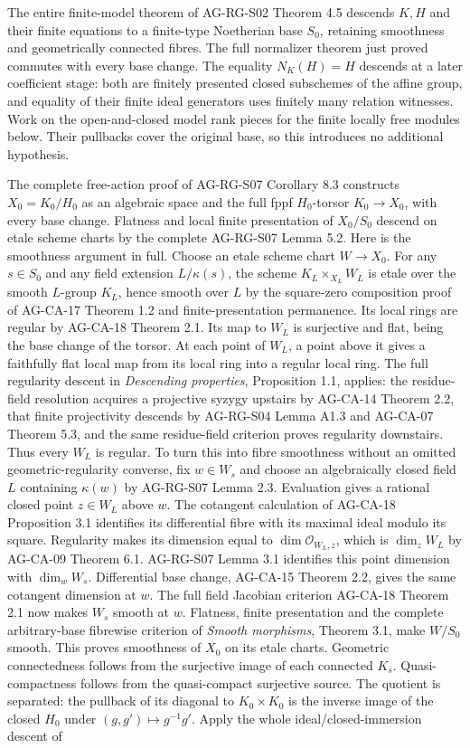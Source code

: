 \documentclass[11pt,a4paper,openany]{report}
\begin{document}
The entire finite-model theorem of AG-RG-S02 Theorem 4.5 descends \(K,H\) and their finite equations to a finite-type Noetherian base \(S_0\), retaining smoothness and geometrically connected fibres. The full normalizer theorem just proved commutes with every base change. The equality \(N_K(H)=H\) descends at a later coefficient stage: both are finitely presented closed subschemes of the affine group, and equality of their finite ideal generators uses finitely many relation witnesses. Work on the open-and-closed model rank pieces for the finite locally free modules below. Their pullbacks cover the original base, so this introduces no additional hypothesis.

The complete free-action proof of AG-RG-S07 Corollary 8.3 constructs \(X_0=K_0/H_0\) as an algebraic space and the full fppf \(H_0\)-torsor \(K_0\to X_0\), with every base change. Flatness and local finite presentation of \(X_0/S_0\) descend on etale scheme charts by the complete AG-RG-S07 Lemma 5.2. Here is the smoothness argument in full. Choose an etale scheme chart \(W\to X_0\). For any \(s\in S_0\) and any field extension \(L/\kappa(s)\), the scheme \(K_L\times_{X_L}W_L\) is etale over the smooth \(L\)-group \(K_L\), hence smooth over \(L\) by the square-zero composition proof of AG-CA-17 Theorem 1.2 and finite-presentation permanence. Its local rings are regular by AG-CA-18 Theorem 2.1. Its map to \(W_L\) is surjective and flat, being the base change of the torsor. At each point of \(W_L\), a point above it gives a faithfully flat local map from its local ring into a regular local ring. The full regularity descent in \emph{Descending properties}, Proposition 1.1, applies: the residue-field resolution acquires a projective syzygy upstairs by AG-CA-14 Theorem 2.2, that finite projectivity descends by AG-RG-S04 Lemma A1.3 and AG-CA-07 Theorem 5.3, and the same residue-field criterion proves regularity downstairs. Thus every \(W_L\) is regular. To turn this into fibre smoothness without an omitted geometric-regularity converse, fix \(w\in W_s\) and choose an algebraically closed field \(L\) containing \(\kappa(w)\) by AG-RG-S07 Lemma 2.3. Evaluation gives a rational closed point \(z\in W_L\) above \(w\). The cotangent calculation of AG-CA-18 Proposition 3.1 identifies its differential fibre with its maximal ideal modulo its square. Regularity makes its dimension equal to \(\dim\mathcal O_{W_L,z}\), which is \(\dim_zW_L\) by AG-CA-09 Theorem 6.1. AG-RG-S07 Lemma 3.1 identifies this point dimension with \(\dim_wW_s\). Differential base change, AG-CA-15 Theorem 2.2, gives the same cotangent dimension at \(w\). The full field Jacobian criterion AG-CA-18 Theorem 2.1 now makes \(W_s\) smooth at \(w\). Flatness, finite presentation and the complete arbitrary-base fibrewise criterion of \emph{Smooth morphisms}, Theorem 3.1, make \(W/S_0\) smooth. This proves smoothness of \(X_0\) on its etale charts. Geometric connectedness follows from the surjective image of each connected \(K_{\bar s}\). Quasi-compactness follows from the quasi-compact surjective source. The quotient is separated: the pullback of its diagonal to \(K_0\times K_0\) is the inverse image of the closed \(H_0\) under \((g,g')\mapsto g^{-1}g'\). Apply the whole ideal/closed-immersion descent of 
\end{document}
